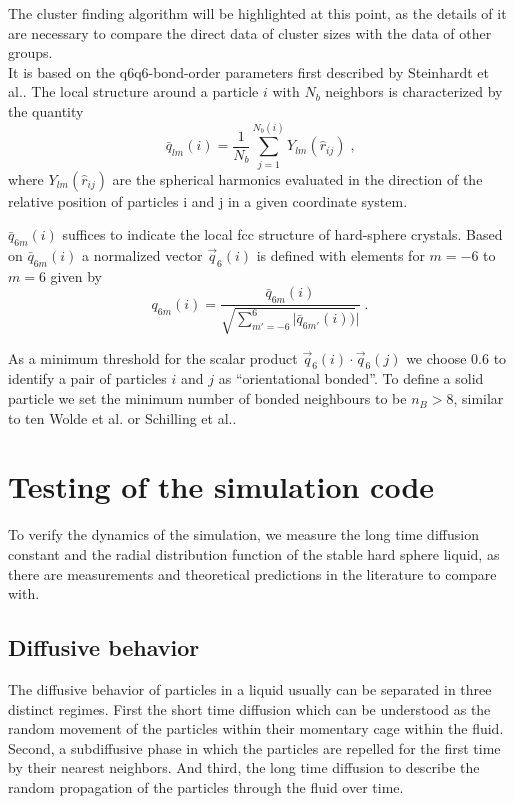 The cluster finding algorithm will be highlighted at this point, as the details of it are necessary to compare the direct data of cluster sizes with the data of other groups.\\ 
It is based on the q6q6-bond-order parameters first described by Steinhardt et al.\cite{Steinhardt1983}.
The local structure around a particle $i$ with $N_b$ neighbors is characterized by the quantity
\begin{equation}
\label{eqn:local_q6}
\bar{q}_{lm}(i) = \frac{1}{N_b} \sum^{N_b (i)}_{j=1} Y_{lm} (\hat{r}_{ij}) \; \text{,}
\end{equation}
where $Y_{lm}(\hat{r}_{ij})$ are the spherical harmonics evaluated in the direction of the relative position of particles i and j in a given coordinate system.

$\bar{q}_{6m}(i)$ suffices to indicate the local fcc structure of hard-sphere crystals. Based on $\bar{q}_{6m}(i)$  a normalized vector $\vec{q}_{6}(i)$ is defined with elements for $m=-6$ to $m=6$ given by
\begin{equation}
q_{6m}(i) = \frac{\bar{q}_{6m}(i)}{ \sqrt{\sum_{m'=-6}^{6} |{\bar{q}_{6m'}(i)})}|  } \; \text{.}
\end{equation}

As a minimum threshold for the scalar product $\vec{q}_6(i) \cdot \vec{q}_6(j)$ we choose 0.6 to identify a pair of particles $i$ and $j$ as ``orientational bonded''. To define a solid particle we set the minimum number of bonded neighbours to be $n_B > 8$, similar to ten Wolde et al.\cite{TenWolde1995} or Schilling et al.\cite{Schilling2011}.\\

\section{Testing of the simulation code}
\label{sec:probe}
To verify the dynamics of the simulation, we measure the long time diffusion constant and the radial distribution function of the stable hard sphere liquid, as there are measurements and theoretical predictions in the literature to compare with.

\subsection{Diffusive behavior}
\label{sec:diffusion_probe}
The diffusive behavior of particles in a liquid usually can be separated in three distinct regimes. First the short time diffusion which can be understood as the random movement of the particles within their momentary cage within the fluid. Second, a subdiffusive phase in which the particles are repelled for the first time by their nearest neighbors. And third, the long time diffusion to describe the random propagation of the particles through the fluid over time.\\
   
